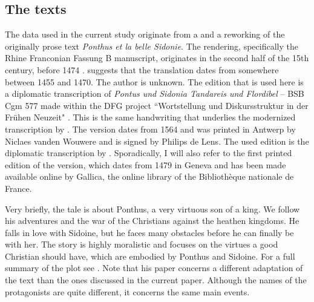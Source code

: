 \documentclass[output=paper,colorlinks,citecolor=brown]{langscibook}
\begin{document}
\subsection{The texts}\label{sec:3.1}
The data used in the current study originate from a  and a  reworking of the originally  prose text \textit{Ponthus et la belle Sidonie}. The  rendering, specifically the Rhine Franconian Fassung B manuscript, originates in the second half of the 15th century, before 1474 \citep[25]{BertelsmeierKierst2019}. \citet[28]{Schneider1961} suggests that the translation dates from somewhere between 1455 and 1470. The author is unknown. The edition that is used here is a diplomatic transcription of \textit{Pontus und Sidonia Tandareis und Flordibel} -- BSB Cgm 577 made within the DFG project ``Wortstellung und Diskursstruktur in der Frühen Neuzeit" \citep{RokoUP}. This is the same handwriting that underlies the modernized transcription by \citet{Schneider1961}. The  version dates from 1564 and was printed in Antwerp by Niclaes vanden Wouwere and is signed by Philips de Lens. The used edition is the diplomatic transcription by \citet{Kuiper2010}. Sporadically, I will also refer to the first printed edition of the  version, which dates from 1479 in Geneva \citep[75]{BesamuscaWillaert2019} and has been made available online by Gallica, the online library of the Bibliothèque nationale de France.

Very briefly, the tale is about Ponthus, a very virtuous son of a king. We follow his adventures and the war of the Christians against the heathen kingdoms. He falls in love with Sidoine, but he faces many obstacles before he can finally be with her. The story is highly moralistic and focuses on the virtues a good Christian should have, which are embodied by Ponthus and Sidoine. For a full summary of the plot see \citet[549--551]{Classen2016}. Note that his paper concerns a different adaptation of the text than the ones discussed in the current paper. Although the names of the protagonists are quite different, it concerns the same main events.
\end{document}

